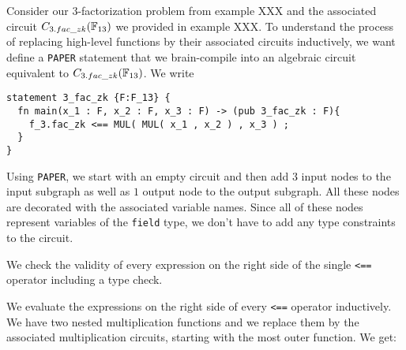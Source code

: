 \begin{example}[$3$-factorization] Consider our $3$-factorization problem from example XXX and the associated circuit $C_{3.fac\_zk}(\mathbb{F}_{13})$ we provided in example XXX. To understand the process of replacing high-level functions by their associated circuits inductively, we want define a \texttt{PAPER} statement that we brain-compile into an algebraic circuit equivalent to $C_{3.fac\_zk}(\mathbb{F}_{13})$. We write
\begin{lstlisting}
statement 3_fac_zk {F:F_13} {
  fn main(x_1 : F, x_2 : F, x_3 : F) -> (pub 3_fac_zk : F){
    f_3.fac_zk <== MUL( MUL( x_1 , x_2 ) , x_3 ) ;
  }
}
\end{lstlisting} 
Using \texttt{PAPER}, we start with an empty circuit and then add $3$ input nodes to the input subgraph as well as $1$ output node to the output subgraph. All these nodes are decorated with the associated variable names. Since all of these nodes represent variables of the \texttt{field} type, we don't have to add any type constraints to the circuit.

We check the validity of every expression on the right side of the single \texttt{<==} operator including a type check. 

We evaluate the expressions on the right side of every \texttt{<==} operator inductively. We have two nested multiplication functions and we replace them by the associated multiplication circuits, starting with the most outer function. We get: 
\begin{center}
\end{center}
\end{example}
